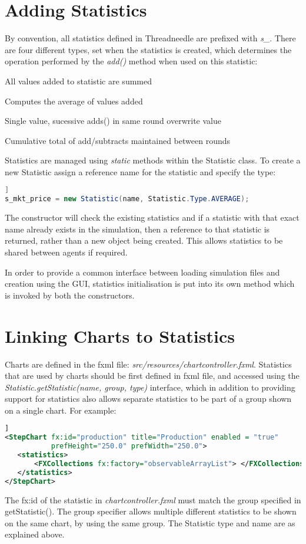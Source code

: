 \documentclass[10pt,oneside,openright, a4paper]{memoir}
\begin{document}
\section{Adding Statistics}
By convention, all statistics defined in Threadneedle are prefixed 
with \emph{s\_}. There are four different types, set when the statistics
is created, which determines the operation performed by the \emph{add()}
method when used on this statistic:
\begin{description}[align=left]
\item [COUNTER] All values added to statistic are summed
\item [AVERAGE] Computes the average of values added
\item [SINGLE ]  Single value, sucessive adds() in same round overwrite value
\item [NUMBER ]  Cumulative total of add/subtracts maintained between rounds
\end{description}
\par
Statistics are managed using \emph{static} methods within the Statistic
class. To create a new Statistic assign a reference name for the statistic
and specify the type:
\begin{lstlisting}[caption=Statistic,label=lst:statistic,language=java]]
s_mkt_price = new Statistic(name, Statistic.Type.AVERAGE);
\end{lstlisting}
The constructor will check the existing statistics and 
if a statistic with that exact name already exists in the simulation,
then a reference to that statistic is returned, rather than a new
object being created. This allows statistics to be shared between
agents if required. 
\par
In order to provide a common interface between loading simulation
files and creation using the GUI, statistics initialisation is put
into its own method which is invoked by both the constructors.
\newpage
\section{Linking Charts to Statistics}
\label{ch:charts}
Charts are defined in the fxml file: \emph{src/resources/chartcontroller.fxml}.
Statistics that are used by charts should be first defined in fxml file,
and accessed using the \emph{Statistic.getStatistic(name, group, type)} 
interface, which in addition to providing support for statistics also
allows separate statistics to be part of a group shown on a single chart. 
For example:
\begin{lstlisting}[caption=Statistic fxml,label=lst:statistic-fxml,language=xml]]
<StepChart fx:id="production" title="Production" enabled = "true" 
           prefHeight="250.0" prefWidth="250.0">
   <statistics>
       <FXCollections fx:factory="observableArrayList"> </FXCollections>
   </statistics>
</StepChart>
\end{lstlisting}
The fx:id of the statistic in \emph{chartcontroller.fxml} must match the 
group specified in getStatistic(). The group specifier allows multiple
different statistics to be shown on the same chart, by using the same
group. The Statistic type and name are as explained above.
\end{document}
